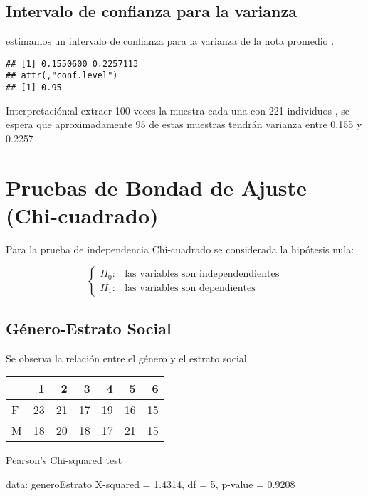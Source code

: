 \documentclass[
  man]{apa6}
\begin{document}
\hypertarget{intervalo-de-confianza-para-la-varianza}{%
\subsection{Intervalo de confianza para la varianza}\label{intervalo-de-confianza-para-la-varianza}}

estimamos un intervalo de confianza para la varianza de la nota promedio .

\begin{verbatim}
## [1] 0.1550600 0.2257113
## attr(,"conf.level")
## [1] 0.95
\end{verbatim}

Interpretación:al extraer 100 veces la muestra cada una con 221
individuos , se espera que aproximadamente 95 de estas muestras tendrán
varianza entre 0.155 y 0.2257
\newpage

\hypertarget{pruebas-de-bondad-de-ajuste-chi-cuadrado}{%
\section{Pruebas de Bondad de Ajuste (Chi-cuadrado)}\label{pruebas-de-bondad-de-ajuste-chi-cuadrado}}

Para la prueba de independencia Chi-cuadrado se considerada la hipótesis
nula:

\[
\left\{
\begin{array}{ll}
H_{0}: &  \text{las variables son independendientes}\\
H_{1}: & \text{las variables son dependientes}
\end{array}
\right.
\]

\hypertarget{guxe9nero-estrato-social}{%
\subsection{Género-Estrato Social}\label{guxe9nero-estrato-social}}

Se observa la relación entre el género y el estrato social

\begin{center}


\begin{tabular}{l|r|r|r|r|r|r}
\hline
  & 1 & 2 & 3 & 4 & 5 & 6\\
\hline
F & 23 & 21 & 17 & 19 & 16 & 15\\
\hline
M & 18 & 20 & 18 & 17 & 21 & 15\\
\hline
\end{tabular}


    Pearson's Chi-squared test

data:  generoEstrato
X-squared = 1.4314, df = 5, p-value = 0.9208
\end{center}
\end{document}
